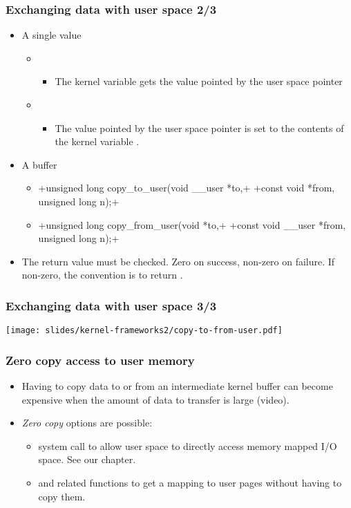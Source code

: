 \begin{frame}[fragile]
  \frametitle{Exchanging data with user space 2/3}
  \begin{itemize}
  \item A single value
    \begin{itemize}
    \item {}
      \begin{itemize}
      \item The kernel variable  gets the value pointed by the
        user space pointer 
      \end{itemize}
    \item {}
      \begin{itemize}
      \item The value pointed by the user space pointer  is
        set to the contents of the kernel variable .
      \end{itemize}
    \end{itemize}
  \item A buffer
    \begin{itemize}
    \item {}+unsigned long copy_to_user(void __user *to,+
      +const void *from, unsigned long n);+
    \item {}+unsigned long copy_from_user(void *to,+
      +const void __user *from, unsigned long n);+
    \end{itemize}
  \item The return value must be checked. Zero on success, non-zero on
    failure. If non-zero, the convention is to return \code{-}.
  \end{itemize}
\end{frame}

\begin{frame}
 \frametitle{Exchanging data with user space 3/3}
 \begin{center}
    \texttt{[image: slides/kernel-frameworks2/copy-to-from-user.pdf]}
 \end{center}
\end{frame}

\begin{frame}
  \frametitle{Zero copy access to user memory}
  \begin{itemize}
  \item Having to copy data to or from an intermediate kernel buffer
    can become expensive when the amount of data to transfer is
    large (video).
  \item \emph{Zero copy} options are possible:
    \begin{itemize}
    \item {} system call to allow user space to directly
      access memory mapped I/O space. See our  chapter.
    \item {} and related functions to get a
      mapping to user pages without having to copy them.
    \end{itemize}
  \end{itemize}
\end{frame}

